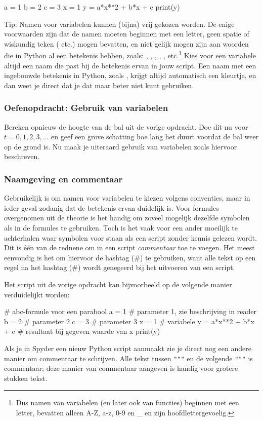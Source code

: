 \documentclass[a4paper,11pt, fleqn]{article}
\begin{document}
\begin{python}
a = 1
b = 2
c = 3
x = 1
y = a*x**2 + b*x + c
print(y)
\end{python}

Tip: Namen voor variabelen kunnen (bijna) vrij gekozen worden. De enige voorwaarden zijn dat de namen moeten beginnen met een letter, geen spatie of wiskundig teken (\pythoninline{+ * /} etc.) mogen bevatten, en niet gelijk mogen zijn aan woorden die in  Python al een betekenis hebben, zoals:  , , , , , etc.\footnote{Dus namen van  variabelen (en later ook van functies) beginnen met een letter, bevatten alleen A-Z, a-z, 0-9 en \_ en zijn hoofdlettergevoelig.} Kies voor een variabele altijd een naam die past bij de betekenis ervan in jouw script. Een naam met een ingebouwde betekenis in Python, zoals , krijgt altijd automatisch een kleurtje, en dan weet je direct dat je dat maar beter niet kunt gebruiken.

\subsubsection*{Oefenopdracht: Gebruik van variabelen} Bereken opnieuw de hoogte van de bal uit de vorige opdracht. Doe dit nu voor $t = 0,1,2,3, ... $ en geef een grove schatting hoe lang het duurt voordat de bal weer op de grond is. Nu maak je uiteraard gebruik van variabelen zoals hiervoor beschreven.

\subsubsection{Naamgeving en commentaar}
Gebruikelijk is om namen voor variabelen te kiezen volgens conventies, maar in ieder geval zodanig dat de betekenis ervan duidelijk is.
Voor formules overgenomen uit de theorie is het handig om zoveel mogelijk dezelfde symbolen als in de formules te gebruiken. 
Toch is het vaak voor een ander moeilijk te achterhalen waar symbolen voor staan als een script zonder kennis gelezen wordt. 
Dit is \'e\'en van de rednene om in een script \textit{commentaar} toe te voegen. 
Het meest eenvoudig is het om hiervoor de hashtag ($\#$) te gebruiken, want alle tekst op een regel na het hashtag ($\#$) wordt genegeerd bij het uitvoeren van een script. 

Het script uit de vorige opdracht kan bijvoorbeeld op de volgende manier verduidelijkt worden:
\begin{python}
# abc-formule voor een parabool
a = 1 # parameter 1, zie beschrijving in reader
b = 2 # parameter 2
c = 3 # parameter 3
x = 1 # variabele
y = a*x**2 + b*x + c # resultaat bij gegeven waarde van x 
print(y)
\end{python}
Als je in Spyder een nieuw Python script aanmaakt zie je direct nog een andere manier om commentaar te schrijven. Alle tekst tussen \verb,""", en de volgende \verb,""", is commentaar; deze manier van commentaar aangeven is handig voor grotere stukken tekst. 
\end{document}
